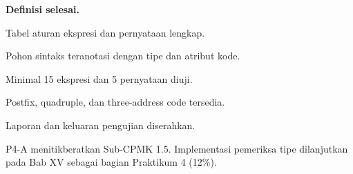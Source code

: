 \textbf{Definisi selesai.}
\begin{checklist}
  \item Tabel aturan ekspresi dan pernyataan lengkap.
  \item Pohon sintaks teranotasi dengan tipe dan atribut kode.
  \item Minimal 15 ekspresi dan 5 pernyataan diuji.
  \item Postfix, quadruple, dan three-address code tersedia.
  \item Laporan dan keluaran pengujian diserahkan.
\end{checklist}

P4-A menitikberatkan Sub-CPMK 1.5. Implementasi pemeriksa tipe
dilanjutkan pada Bab XV sebagai bagian Praktikum 4 (12\%).
